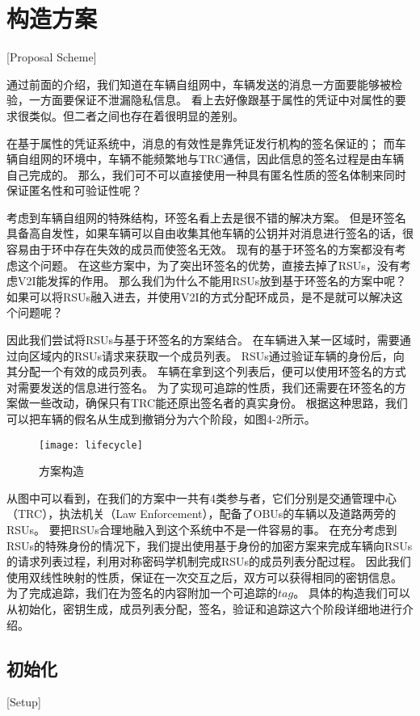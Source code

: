 \section{构造方案}[Proposal Scheme]

通过前面的介绍，我们知道在车辆自组网中，车辆发送的消息一方面要能够被检验，一方面要保证不泄漏隐私信息。
看上去好像跟基于属性的凭证中对属性的要求很类似。但二者之间也存在着很明显的差别。

在基于属性的凭证系统中，消息的有效性是靠凭证发行机构的签名保证的；
而车辆自组网的环境中，车辆不能频繁地与TRC通信，因此信息的签名过程是由车辆自己完成的。
那么，我们可不可以直接使用一种具有匿名性质的签名体制来同时保证匿名性和可验证性呢？

考虑到车辆自组网的特殊结构，环签名看上去是很不错的解决方案。
但是环签名具备高自发性，如果车辆可以自由收集其他车辆的公钥并对消息进行签名的话，很容易由于环中存在失效的成员而使签名无效。
现有的基于环签名的方案\cite{xiong2010efficient,chaurasia2011conditional,zeng2015privacy}都没有考虑这个问题。
在这些方案中，为了突出环签名的优势，直接去掉了RSUs，没有考虑V2I能发挥的作用。
那么我们为什么不能用RSUs放到基于环签名的方案中呢？
如果可以将RSUs融入进去，并使用V2I的方式分配环成员，是不是就可以解决这个问题呢？

因此我们尝试将RSUs与基于环签名的方案结合。
在车辆进入某一区域时，需要通过向区域内的RSUs请求来获取一个成员列表。
RSUs通过验证车辆的身份后，向其分配一个有效的成员列表。
车辆在拿到这个列表后，便可以使用环签名的方式对需要发送的信息进行签名。
为了实现可追踪的性质，我们还需要在环签名的方案做一些改动，确保只有TRC能还原出签名者的真实身份。
根据这种思路，我们可以把车辆的假名从生成到撤销分为六个阶段，如图4-2所示。

\begin{figure}[h]
\centering
\texttt{[image: lifecycle]}
\caption{方案构造}
\end{figure}

从图中可以看到，在我们的方案中一共有4类参与者，它们分别是交通管理中心（TRC），执法机关（Law Enforcement），配备了OBUs的车辆以及道路两旁的RSUs。
要把RSUs合理地融入到这个系统中不是一件容易的事。
在充分考虑到RSUs的特殊身份的情况下，我们提出使用基于身份的加密方案来完成车辆向RSUs的请求列表过程，利用对称密码学机制完成RSUs的成员列表分配过程。
因此我们使用双线性映射的性质，保证在一次交互之后，双方可以获得相同的密钥信息。
为了完成追踪，我们在为签名的内容附加一个可追踪的$tag$。
具体的构造我们可以从初始化，密钥生成，成员列表分配，签名，验证和追踪这六个阶段详细地进行介绍。

\subsection{初始化}[Setup]


